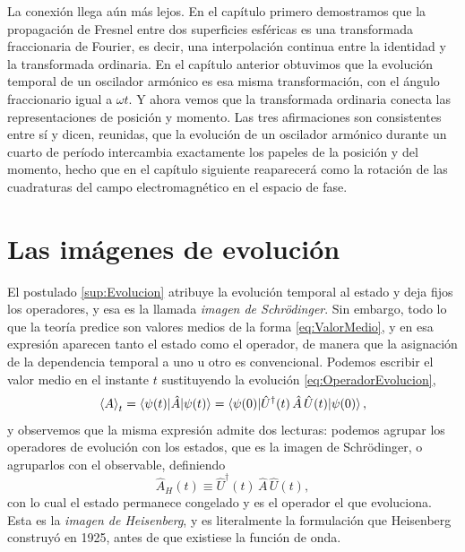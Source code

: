         La conexión llega aún más lejos. En el capítulo primero demostramos que la propagación de Fresnel entre dos superficies esféricas es una transformada fraccionaria de Fourier, es decir, una interpolación continua entre la identidad y la transformada ordinaria. En el capítulo anterior obtuvimos que la evolución temporal de un oscilador armónico es esa misma transformación, con el ángulo fraccionario igual a $\omega t$. Y ahora vemos que la transformada ordinaria conecta las representaciones de posición y momento. Las tres afirmaciones son consistentes entre sí y dicen, reunidas, que la evolución de un oscilador armónico durante un cuarto de período intercambia exactamente los papeles de la posición y del momento, hecho que en el capítulo siguiente reaparecerá como la rotación de las cuadraturas del campo electromagnético en el espacio de fase.

\section{Las imágenes de evolución}

        El postulado \ref{sup:Evolucion} atribuye la evolución temporal al estado y deja fijos los operadores, y esa es la llamada \textit{imagen de Schrödinger}. Sin embargo, todo lo que la teoría predice son valores medios de la forma \eqref{eq:ValorMedio}, y en esa expresión aparecen tanto el estado como el operador, de manera que la asignación de la dependencia temporal a uno u otro es convencional. Podemos escribir el valor medio en el instante $t$ sustituyendo la evolución \eqref{eq:OperadorEvolucion},
        \begin{equation}\label{eq:ValorMedioEvolucionado}
            \left\langle A\right\rangle_{t} = \braket{\psi(t)|\hat{A}|\psi(t)}
            = \braket{\psi(0)|\hat{U}^{\dagger}(t)\,\hat{A}\,\hat{U}(t)|\psi(0)},
        \end{equation}
        y observemos que la misma expresión admite dos lecturas: podemos agrupar los operadores de evolución con los estados, que es la imagen de Schrödinger, o agruparlos con el observable, definiendo
        \begin{equation}\label{eq:OperadorHeisenberg}
            \hat{A}_{H}(t) \equiv \hat{U}^{\dagger}(t)\,\hat{A}\,\hat{U}(t),
        \end{equation}
        con lo cual el estado permanece congelado y es el operador el que evoluciona. Esta es la \textit{imagen de Heisenberg}, y es literalmente la formulación que Heisenberg construyó en 1925, antes de que existiese la función de onda.

